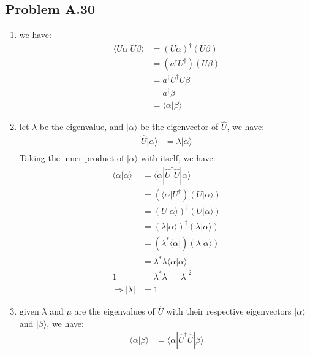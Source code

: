 \documentclass{article}
\begin{document}
\subsection*{Problem A.30}
\begin{enumerate}[label=(\alph*)]
    \item we have:
    \begin{align*}
        \langle U \alpha | U \beta \rangle &= (U \alpha)^\dagger (U \beta) \\
        &= (a^\dagger U^\dagger) (U \beta) \\
        &= a^\dagger U^\dagger U \beta \\
        &= a^\dagger \beta \\
        &= \langle \alpha | \beta \rangle
    \end{align*}
    \item let \(\lambda\) be the eigenvalue, and \(|\alpha\rangle\) be the eigenvector of \(\hat{U}\), we have:
    \begin{align*}
        \hat{U} |\alpha\rangle &= \lambda |\alpha\rangle \\
    \end{align*}
    Taking the inner product of \(|\alpha\rangle\) with itself, we have:
    \begin{align*}
        \langle \alpha | \alpha \rangle &= \langle \alpha | \hat{U}^\dagger \hat{U} | \alpha \rangle \\
        &= \left(\langle \alpha | U^\dagger\right) \left(U | \alpha \rangle\right) \\
        &= \left(U |\alpha\rangle\right)^\dagger \left(U |\alpha\rangle\right) \\
        &= \left(\lambda |\alpha \rangle\right)^\dagger \left(\lambda |\alpha \rangle\right) \\
        &= \left(\lambda^* \langle \alpha |\right) (\lambda | \alpha \rangle) \\
        &= \lambda^* \lambda \langle \alpha | \alpha \rangle \\
        1 &= \lambda^* \lambda = |\lambda|^2 \\
        \Rightarrow |\lambda| &= 1
    \end{align*}
    \item given \(\lambda\) and \(\mu\) are the eigenvalues of \(\hat{U}\) with their respective eigenvectors \(|\alpha\rangle\) and \(|\beta\rangle\), we have:
    \begin{align*}
        \langle \alpha | \beta \rangle &= \langle \alpha | \hat{U}^\dagger \hat{U} | \beta \rangle \\

\end{align*}
\end{enumerate}
\end{document}
